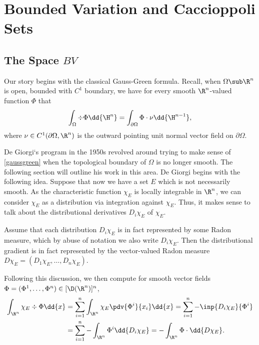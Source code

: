 \documentclass[../main.tex]{subfiles}
\begin{document}
\section{Bounded Variation and Caccioppoli Sets}\label{sec:bv}

\subsection{The Space $ BV $}


\begin{figure}[H]

\end{figure}

Our story begins with the classical Gauss-Green formula. Recall, when $ \Omega\sub \R^{n} $ is open, bounded with $ C^{1} $ boundary, we have for every smooth $ \R^{n} $-valued function $ \Phi $ that
\begin{equation}\label{gaussgreen}
    \int_{\Omega} \div{\Phi} \dd{\H^{n}} = \int_{\partial \Omega} \Phi\cdot \nu \dd{\H^{n-1}},
\end{equation}
where $ \nu\in C^{1}(\partial \Omega, \R^{n})  $ is the outward pointing unit normal vector field on $ \partial \Omega $.



De Giorgi`s program in the 1950s revolved around trying to make sense of \eqref{gaussgreen} when the topological boundary of $ \Omega $ is no longer smooth. The following section will outline his work in this area. De Giorgi begins with the following idea. Suppose that now we have a set $ E $ which is not necessarily smooth. As the characteristic function $ \chi_{E} $ is locally integrable in $ \R^{n} $, we can consider $ \chi_{E} $ as a distribution via integration against $ \chi_{E} $. Thus, it makes sense to talk about the distributional derivatives $ D_{i}\chi_{E} $ of $ \chi_{E} $. 

Assume that each distribution $ D_{i} \chi_{E} $ is in fact represented by some Radon measure, which by abuse of notation we also write $ D_{i} \chi_{E} $. Then the distributional gradient is in fact represented by the vector-valued Radon measure $ D\chi_{E} = (D_{1} \chi_{E}, \ldots, D_{n}\chi_{E}) $.

Following this discussion, we then compute for smooth vector fields $ \Phi = ( \Phi^{1}, \ldots, \Phi^{n})\in [\D(\R^{n})]^{n} $,
\begin{align*}
    \int_{\R^{n}} \chi_{E}\div{\Phi} \dd{x} &= \sum_{i=1}^{n}\int_{\R^{n}} \chi_{E} \pdv{\Phi^{i}}{x_{i}} \dd{x} = \sum_{i=1}^{n} -\inp{D_{i} \chi_{E}}{\Phi^{i}} \\
    &= \sum_{i=1}^{n} -\int_{\R^{n}} \Phi^{i} \dd{D_{i} \chi_{E}}= - \int_{\R^{n}} \Phi\cdot \dd{D \chi_{E}}.
\end{align*}
\end{document}
